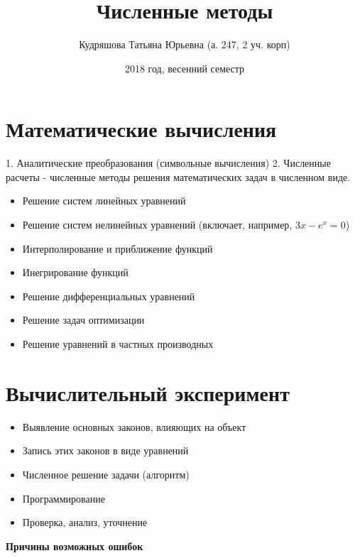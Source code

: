 \documentclass[a4paper,12pt]{report}
\author{Кудряшова Татьяна Юрьевна (а. 247, 2 уч. корп)}
\title{Численные методы}
\date{2018 год, весенний семестр}
\begin{document}
\makeatletter
{}
\makeatother  

\maketitle


\newpage
\setcounter{section}{0}

\section{Математические вычисления}

1. Аналитические преобразования (символьные вычисления)
2. Численные расчеты - численные методы решения математических задач в численном виде.
\begin{itemize}
\item Решение систем линейных уравнений
\item Решение систем нелинейных уравнений (включает, например, $3x-e^x=0$)
\item Интерполирование и приближение функций
\item Инегрирование функций
\item Решение дифференциальных уравнений
\item Решение задач оптимизации
\item Решение уравнений в частных производных
\end{itemize}

\section{Вычислительный эксперимент}
\begin{itemize}
\item Выявление основных законов, влияющих на объект
\item Запись этих законов в виде уравнений
\item Численное решение задачи (алгоритм)
\item Программирование
\item Проверка, анализ, уточнение
\end{itemize}

\begin{center}
\textbf{Причины возможных ошибок}
\end{center}
\end{document}
